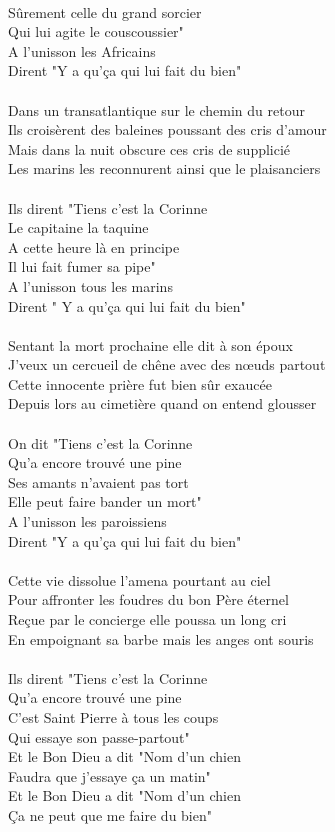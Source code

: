 \\Sûrement celle du grand sorcier
\\Qui lui agite le couscoussier"
\\A l'unisson les Africains
\\Dirent "Y a qu'ça qui lui fait du bien"
\\\\Dans un transatlantique sur le chemin du retour
\\Ils croisèrent des baleines poussant des cris d'amour
\\Mais dans la nuit obscure ces cris de supplicié
\\Les marins les reconnurent ainsi que le plaisanciers
\\\\Ils dirent "Tiens c'est la Corinne
\\Le capitaine la taquine
\\A cette heure là en principe
\\Il lui fait fumer sa pipe"
\\A l'unisson tous les marins
\\Dirent " Y a qu'ça qui lui fait du bien"
\\\\Sentant la mort prochaine elle dit à son époux
\\J'veux un cercueil de chêne avec des nœuds partout
\\Cette innocente prière fut bien sûr exaucée
\\Depuis lors au cimetière quand on entend glousser
\\\\On dit "Tiens c'est la Corinne
\\Qu'a encore trouvé une pine
\\Ses amants n'avaient pas tort
\\Elle peut faire bander un mort"
\\A l'unisson les paroissiens
\\Dirent "Y a qu'ça qui lui fait du bien"
\\\\Cette vie dissolue l'amena pourtant au ciel
\\Pour affronter les foudres du bon Père éternel
\\Reçue par le concierge elle poussa un long cri
\\En empoignant sa barbe mais les anges ont souris
\\\\Ils dirent "Tiens c'est la Corinne
\\Qu'a encore trouvé une pine
\\C'est Saint Pierre à tous les coups
\\Qui essaye son passe-partout"
\\Et le Bon Dieu a dit "Nom d'un chien
\\Faudra que j'essaye ça un matin"
\\Et le Bon Dieu a dit "Nom d'un chien
\\Ça ne peut que me faire du bien"
\breakpage